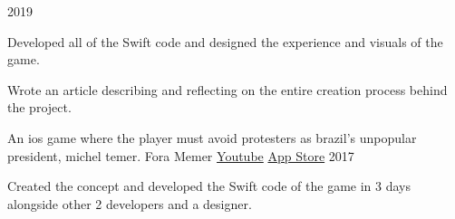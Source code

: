 \begin{cventries}
    {2019}
    {
      \begin{cvitems}
        \item {Developed all of the Swift code and designed the experience and visuals of the game.}
        \item {Wrote an article describing and reflecting on the entire creation process behind the project.}
      \end{cvitems}
    }
  \cventry
    {An ios game where the player must avoid protesters as brazil's unpopular president, michel temer.}
    {Fora Memer}
    {\href{https://youtu.be/YwVg7Yuu3pY}{Youtube} \hspace{4pt} \href{https://itunes.apple.com/br/app/fora-memer/id1253655537}{App Store}}
    {2017}
    {
      \begin{cvitems}
        \item {Created the concept and developed the Swift code of the game in 3 days alongside other 2 developers and a designer.}
      \end{cvitems}
    }
\end{cventries}
